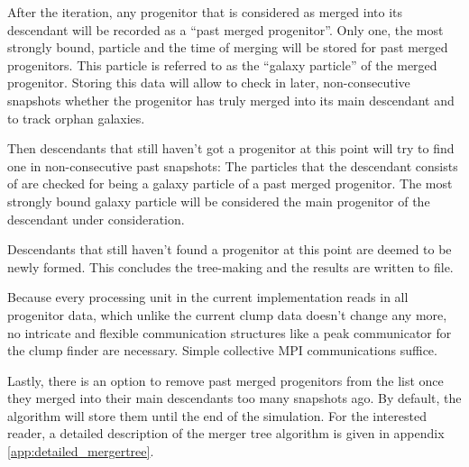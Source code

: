 After the iteration, any progenitor that is considered as merged into its descendant will be recorded as a ``past merged progenitor''.
Only one, the most strongly bound, particle and the time of merging will be stored for past merged progenitors.
This particle is referred to as the ``galaxy particle'' of the merged progenitor.
Storing this data will allow to check in later, non-consecutive snapshots whether the progenitor has truly merged into its main descendant and to track orphan galaxies.

Then descendants that still haven't got a progenitor at this point will try to find one in non-consecutive past snapshots:
The particles that the descendant consists of are checked for being a galaxy particle of a past merged progenitor. 
The most strongly bound galaxy particle will be considered the main progenitor of the descendant under consideration.


Descendants that still haven't found a progenitor at this point are deemed to be newly formed.
This concludes the tree-making and the results are written to file.

Because every processing unit in the current implementation reads in all progenitor data, which unlike the current clump data doesn't change any more, no intricate and flexible communication structures like a peak communicator for the clump finder are necessary.
Simple collective MPI communications suffice.

Lastly, there is an option to remove past merged progenitors from the list once they merged into their main descendants too many snapshots ago.
By default, the algorithm will store them until the end of the simulation.
For the interested reader, a detailed description of the merger tree algorithm is given in appendix \ref{app:detailed_mergertree}.





